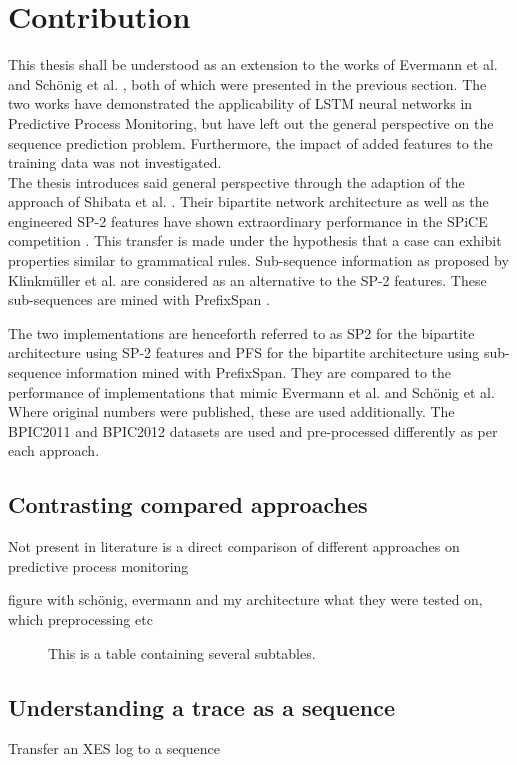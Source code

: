 \chapter{Contribution}\label{sec:contribution}

This thesis shall be understood as an extension to the works of Evermann et al. \cite{evermann2016} and Schönig et al. \cite{schoenig2018}, both of which were presented in the previous section. The two works have demonstrated the applicability of LSTM neural networks in Predictive Process Monitoring, but have left out the general perspective on the sequence prediction problem. Furthermore, the impact of added features to the training data was not investigated.\\

The thesis introduces said general perspective through the adaption of the approach of Shibata et al. \cite{shibata2016bipartite}. Their bipartite network architecture as well as the engineered SP-2 features have shown extraordinary performance in the SPiCE competition \cite{web:spice}. This transfer is made under the hypothesis that a case can exhibit properties similar to grammatical rules. Sub-sequence information as proposed by Klinkmüller et al. \cite{klinkmuller2018reliablemonitoring} are considered as an alternative to the SP-2 features. These sub-sequences are mined with PrefixSpan \cite{pei2001prefixspan}.

The two implementations are henceforth referred to as SP2 for the bipartite architecture using SP-2 features and PFS for the bipartite architecture using sub-sequence information mined with PrefixSpan. They are compared to the performance of implementations that mimic Evermann et al. and Schönig et al. Where original numbers were published, these are used additionally. The BPIC2011 \cite{BPIC2011} and BPIC2012 \cite{BPIC2012} datasets are used and pre-processed differently as per each approach.\\

\section{Contrasting compared approaches}
Not present in literature is a direct comparison of different approaches on predictive process monitoring

figure with schönig, evermann and my architecture
what they were tested on, which preprocessing etc


\begin{figure}[ht]
\centering
\subfloat[][]{}
\qquad
\subfloat[][]{}
\caption{This is a table containing several subtables.}
\end{figure}



\section{Understanding a trace as a sequence}
Transfer an XES log to a sequence